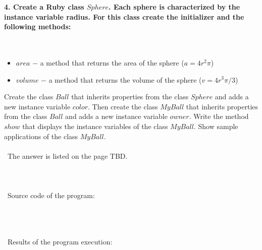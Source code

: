 \documentclass{article}
\begin{document}
\paragraph{}\
\paragraph{}\



\paragraph{4. Create a Ruby class \(Sphere\). Each sphere is characterized by the instance variable radius. For this class create the initializer and the following methods: }\

	\begin{itemize}
		\item \(area\) \(-\) a method that returns the area of the sphere (\(a = 4r^2\pi\))
		\item \(volume\) \(-\) a method that returns the volume of the sphere (\(v = 4r^3\pi / 3\))
	\end{itemize}
	
	Create the class \(Ball\) that inherits properties from the class \(Sphere\) and adds a new instance variable \(color\). Then create the class \(MyBall\) that inherits properties from the class \(Ball\) and adds a new instance variable \(owner\). Write the method \(show\) that displays the instance variables of the class \(MyBall\). Show sample applications of the class \(MyBall\).

\paragraph{}\
	The answer is listed on the page TBD.
	
\paragraph{}\
\paragraph{}\
Source code of the program:

\begin{verbatim}
\end{verbatim}

\paragraph{}\
\paragraph{}\
	Results of the program execution:
	
\begin{verbatim} 
\end{verbatim}

\paragraph{}\
\paragraph{}\
\end{document}
